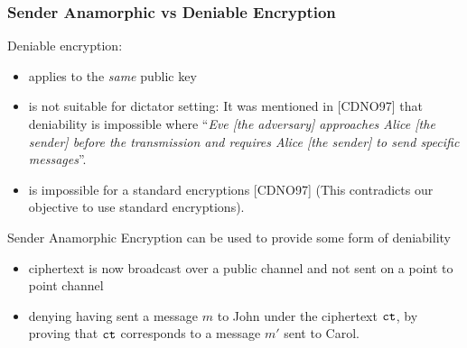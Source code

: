 \documentclass[handout]{beamer}
\begin{document}







\begin{frame}
\frametitle{Sender Anamorphic vs Deniable Encryption}
Deniable encryption:
\begin{itemize}
\item  applies to the {\em same } public key
\item is not suitable for dictator setting: It was mentioned in [CDNO97] that deniability is impossible where
``{\color{brown}\em Eve [the adversary] approaches Alice [the sender] {\em before} the transmission and requires Alice [the sender]
to send specific messages}''. 
\item is impossible for a standard encryptions [CDNO97] (This contradicts our objective to use standard encryptions).
\end{itemize}
\pause
Sender Anamorphic Encryption can be used to provide some form of deniability
\begin{itemize}

        \item ciphertext is now broadcast over a public channel and not sent on a point to point channel
        \item denying having sent a message $m$ to John under the ciphertext $\mathtt{ct}$, by proving that $\mathtt{ct}$ corresponds to a message $m'$ sent to Carol. 
\end{itemize}

\end{frame}
\end{document}
